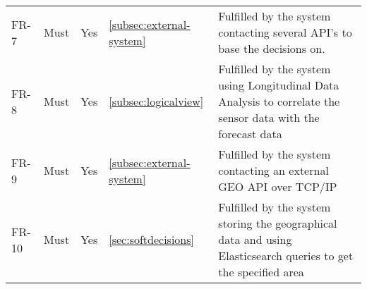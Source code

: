 \begin{table}[H]
\begin{tabular}{lllll}
		FR-7  & Must     & Yes        & \ref{subsec:external-system}         & Fulfilled by the system contacting several API's to base the decisions on. \\ 
		
		FR-8  & Must     & Yes        & \ref{subsec:logicalview}         & Fulfilled by the system using Longitudinal Data Analysis to correlate the sensor data with the forecast data \\ 
		
		FR-9  & Must     & Yes        & \ref{subsec:external-system} & Fulfilled by the system contacting an external GEO API over TCP/IP\\
		
		FR-10 & Must     & Yes        & \ref{sec:softdecisions}         & Fulfilled by the system storing the geographical data and using Elasticsearch queries to get the specified area \\ 
		

\end{tabular}
\end{table}
